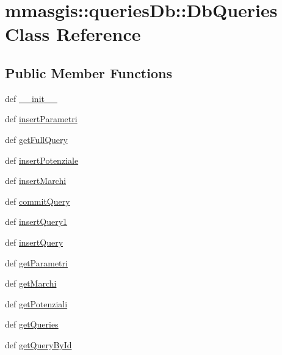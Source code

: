 \hypertarget{classmmasgis_1_1queriesDb_1_1DbQueries}{
\section{mmasgis::queriesDb::DbQueries Class Reference}
\label{classmmasgis_1_1queriesDb_1_1DbQueries}
}
\subsection*{Public Member Functions}
\begin{DoxyCompactItemize}
\item 
def \hyperlink{classmmasgis_1_1queriesDb_1_1DbQueries_a42c8631ef86b4000397a770e8c447fc5}{\_\-\_\-init\_\-\_\-}
\item 
def \hyperlink{classmmasgis_1_1queriesDb_1_1DbQueries_adb123a39b44462afe0c6d5c3bfbcec80}{insertParametri}
\item 
def \hyperlink{classmmasgis_1_1queriesDb_1_1DbQueries_aaa833126e22ebdcb51c16a87767e987d}{getFullQuery}
\item 
def \hyperlink{classmmasgis_1_1queriesDb_1_1DbQueries_ac1cde38c687abbeb2acf6eb3d0b19c5c}{insertPotenziale}
\item 
def \hyperlink{classmmasgis_1_1queriesDb_1_1DbQueries_a3a6226323cd0e86a34b4480d39c0f332}{insertMarchi}
\item 
def \hyperlink{classmmasgis_1_1queriesDb_1_1DbQueries_a3cd7ca0d8b60eb6397d702e726e9e8e4}{commitQuery}
\item 
def \hyperlink{classmmasgis_1_1queriesDb_1_1DbQueries_aaea7ab455bc52bfbb3adb027e8bec249}{insertQuery1}
\item 
def \hyperlink{classmmasgis_1_1queriesDb_1_1DbQueries_a71813dd9cbdf29626362a58de9d977bb}{insertQuery}
\item 
def \hyperlink{classmmasgis_1_1queriesDb_1_1DbQueries_aaeb4101870eae18ed9b472e25238f2b9}{getParametri}
\item 
def \hyperlink{classmmasgis_1_1queriesDb_1_1DbQueries_a8998069d0e06c47e747478bbc52facdc}{getMarchi}
\item 
def \hyperlink{classmmasgis_1_1queriesDb_1_1DbQueries_a80df71df9c626b02b0db40250cf1c170}{getPotenziali}
\item 
def \hyperlink{classmmasgis_1_1queriesDb_1_1DbQueries_a48a4fb600084a6e8acb44474798d2ef8}{getQueries}
\item 
def \hyperlink{classmmasgis_1_1queriesDb_1_1DbQueries_afeadc19e0479331b8aa6dd328096695a}{getQueryById}
\end{DoxyCompactItemize}
